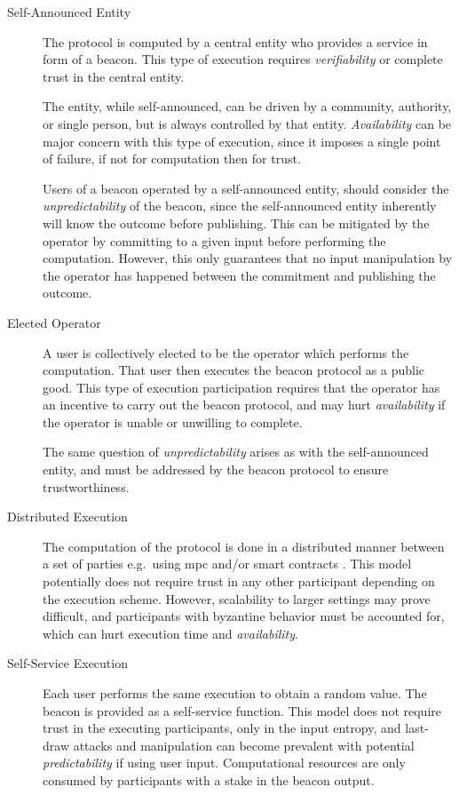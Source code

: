 \begin{description}
    \item[Self-Announced Entity]
        The protocol is computed by a central entity who provides a service in form of a beacon.
        This type of execution requires \emph{verifiability} or complete trust in the central entity.

        The entity, while self-announced, can be driven by a community, authority, or single person, but is always controlled by that entity.
        \emph{Availability} can be major concern with this type of execution, since it imposes a single point of failure, if not for computation then for trust.

        Users of a beacon operated by a self-announced entity, should consider the \emph{unpredictability} of the beacon, since the self-announced entity inherently will know the outcome before publishing.
        This can be mitigated by the operator by committing to a given input before performing the computation.
        However, this only guarantees that no input manipulation by the operator has happened between the commitment and publishing the outcome.

    \item[Elected Operator]
        A user is collectively elected  to be the operator which performs the computation.
        That user then executes the beacon protocol as a public good.
        This type of execution participation requires that the operator has an incentive to carry out the beacon protocol, and may hurt \emph{availability} if the operator is unable or unwilling to complete.

        The same question of \emph{unpredictability} arises as with the self-announced entity, and must be addressed by the beacon protocol to ensure trustworthiness.

    \item[Distributed Execution]
        The computation of the protocol is done in a distributed manner between a set of parties e.g.\ using \gls{mpc} and/or smart contracts .
        This model potentially does not require trust in any other participant depending on the execution scheme.
        However, scalability to larger settings may prove difficult, and participants with byzantine behavior must be accounted for, which can hurt execution time and \emph{availability}.

    \item[Self-Service Execution]
        Each user performs the same execution to obtain a random value. The beacon is provided as a self-service function.
        This model does not require trust in the executing participants, only in the input entropy, and last-draw attacks and manipulation can become prevalent with potential \emph{predictability} if using user input.
        Computational resources are only consumed by participants with a stake in the beacon output.


\end{description}
